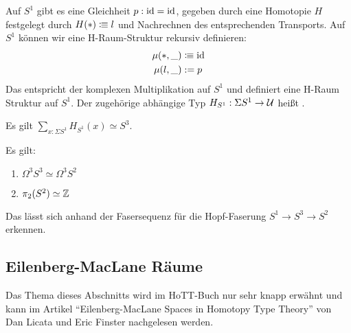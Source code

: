 \begin{beispiel}
  Auf $S^1$ gibt es eine Gleichheit $p:\mathrm{id}=\mathrm{id}$, gegeben durch eine Homotopie $H$ festgelegt durch $H(\ast)\vcentcolon\mspace{-1.2mu}\equiv l$ und Nachrechnen des entsprechenden Transports.
  Auf $S^1$ können wir eine H-Raum-Struktur rekursiv definieren:
  \begin{align*}
    \mu(\ast,\_)&\vcentcolon\mspace{-1.2mu}\equiv \mathrm{id} \\
    \mu(l,\_)&:=  p
  \end{align*}
  Das entspricht der komplexen Multiplikation auf $S^1$ und definiert eine H-Raum Struktur auf $S^1$.
  Der zugehörige abhängige Typ $H_{S^1}:\Sigma S^1\to\mathcal{U}$ heißt .
\end{beispiel}

\begin{fakt}
  Es gilt $\sum_{x:\Sigma S^1}H_{S^1}(x)\simeq S^3$.
\end{fakt}

\begin{theorem}
  Es gilt:
  \begin{enumerate}
  \item $\Omega^3S^3\simeq \Omega^3S^2$
  \item $\pi_2(S^2)\simeq \mathbb{Z}$
  \end{enumerate}
\end{theorem}
\begin{beweis}[Ansatz]
  Das lässt sich anhand der Fasersequenz für die Hopf-Faserung $S^1\to S^3\to S^2$ erkennen.
\end{beweis}

\subsection{Eilenberg-MacLane Räume}
Das Thema dieses Abschnitts wird im HoTT-Buch nur sehr knapp erwähnt und kann im Artikel ``Eilenberg-MacLane Spaces in Homotopy Type Theory'' von Dan Licata und Eric Finster nachgelesen werden.

